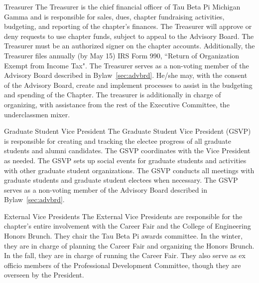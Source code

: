 \begin{enumsubsection}
\item{Treasurer} The Treasurer is  the chief financial officer of Tau Beta Pi Michigan Gamma and is responsible for sales, dues, chapter fundraising activities, budgeting, and reporting of the chapter's finances.  The Treasurer will approve or deny requests to use chapter funds, subject to appeal to the Advisory Board. The Treasurer must be an authorized signer on the chapter accounts.  Additionally, the Treasurer files annually (by May 15) IRS Form 990, 
 ``Return of Organization Exempt from Income Tax".  The Treasurer serves as a non-voting member of the Advisory Board described in Bylaw~\ref{sec:advbrd}. He/she may, with the consent of the Advisory Board, create and implement processes to assist in the budgeting and spending of the Chapter. The treasurer is additionally in charge of organizing, with assistance from the rest of the Executive Committee, the underclassmen mixer.

\item{Graduate Student Vice President} The Graduate Student Vice President (GSVP) is responsible for creating and tracking the electee progress of all graduate students and alumni candidates. The GSVP coordinates with the Vice President as needed. The GSVP sets up social events for graduate students and activities with other graduate student organizations. The GSVP conducts all meetings with graduate students and graduate student electees when necessary. The GSVP serves as a non-voting member of the Advisory Board described in Bylaw~\ref{sec:advbrd}.

\item{External Vice Presidents} The External Vice Presidents are responsible for the chapter's entire involvement with the Career Fair and the College of Engineering Honors Brunch. They chair the Tau Beta Pi awards committee. In the winter, they are in charge of planning the Career Fair and organizing the Honors Brunch. In the fall, they are in charge of running the Career Fair. They also serve as ex officio members of the Professional Development Committee, though they are overseen by the President.
\end{enumsubsection}

